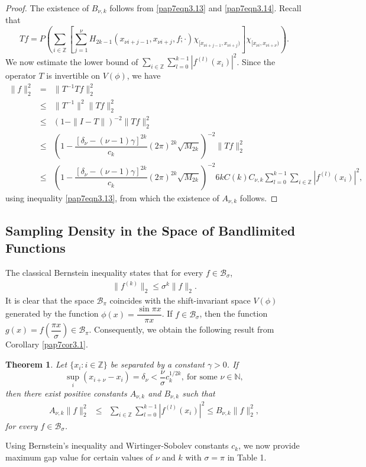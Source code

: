 \documentclass[a4paper,12pt,reqno]{amsart}
\theoremstyle{plain}
\newtheorem{thm}{Theorem}[section]
\numberwithin{equation}{section}
\theoremstyle{definition}
\newcommand{\ds}{\displaystyle}
\begin{document}
\begin{proof}
The existence of $B_{\nu,k}$ follows from \eqref{pap7eqn3.13} and \eqref{pap7eqn3.14}.
Recall that $$Tf=P\left(\sum\limits_{i\in\mathbb{Z}}\left[\sum\limits_{j=1}^{\nu}H_{2k-1}(x_{\nu i+j-1},x_{\nu i+j},f;\cdot)\chi_{[x_{\nu i+j-1},x_{\nu i+j})}\right]\chi_{[x_{\nu i},x_{\nu i+\nu})}\right).$$ 
We now estimate the lower bound of $\ds\sum\limits_{i\in\mathbb{Z}}\ds\sum\limits_{l=0}^{k-1}|f^{(l)}(x_i)|^2$. Since the operator $T$ is invertible on $V(\phi)$, we have
\begin{eqnarray}\label{pap3eqn2.8}
\|f\|_2^2&=&\|T^{-1}Tf\|_2^2\nonumber\\
&\leq&\|T^{-1}\|^2\|Tf\|_2^2\nonumber\\
&\leq&(1-\|I-T\|)^{-2}\|Tf\|_2^2\nonumber\\
&\leq&\left(1-\dfrac{[\delta_\nu-(\nu-1) \gamma]^{2k}}{c_{k}}(2\pi)^{2k}\sqrt{M_{2k}}\right)^{-2}\|Tf\|_2^2\nonumber\\
&\leq&\left(1-\dfrac{[\delta_\nu-(\nu-1) \gamma]^{2k}}{c_{k}}(2\pi)^{2k}\sqrt{M_{2k}}\right)^{-2}6kC(k)C_{\nu,k}\ds\sum\limits_{l=0}^{k-1}\ds\sum\limits_{i\in\mathbb{Z}}|f^{(l)}(x_{i})|^2,\nonumber
\end{eqnarray}
using inequality \eqref{pap7eqn3.13}, from which the existence of $A_{\nu,k}$ follows.
\end{proof}

\subsection{Sampling Density in the Space of Bandlimited Functions}
The classical Bernstein inequality states that for every $f\in \mathcal{B}_\sigma$,
\begin{eqnarray}
\|f^{(k)}\|_2\leq \sigma^k\|f\|_2.
\end{eqnarray}
It is clear that the space $\mathcal{B}_\pi$ coincides with the shift-invariant space $V(\phi)$ generated by the function $\phi(x)=\dfrac{\sin\pi x}{\pi x}$.
If $f\in \mathcal{B}_\sigma$, then the function $g(x)=f\left(\dfrac{\pi x}{\sigma}\right)\in \mathcal{B}_\pi$. Consequently, we obtain the following  result from Corollary \ref{pap7cor3.1}.
\begin{thm}\label{pap7thm3.3}
Let $\{x_i:{i\in\mathbb{Z}}\}$ be separated by a constant $\gamma>0$.
If  
$$\sup\limits_i(x_{i+\nu}-x_i)=\delta_\nu<\dfrac{\nu}{\sigma}c_k^{1/2k},~ \text{for some~} \nu\in\mathbb{N},$$
then  there exist positive constants 
$A_{\nu,k}$  and $B_{\nu,k}$ such that
\begin{eqnarray}\label{pap3eqn2.7}
A_{\nu,k}\| f\|_2^2&\leq&\ds\sum\limits_{i\in\mathbb{Z}}
\ds\sum\limits_{l=0}^{k-1}|f^{(l)}(x_i)|^2\leq B_{\nu,k}\| f\|_2^2,
\end{eqnarray}
for every $f\in \mathcal{B}_\sigma$.
\end{thm}
Using Bernstein's inequality and Wirtinger-Sobolev constants $c_k$, we now provide maximum gap value for certain values of $\nu$ and $k$ with $\sigma=\pi$ in Table 1.
\end{document}
